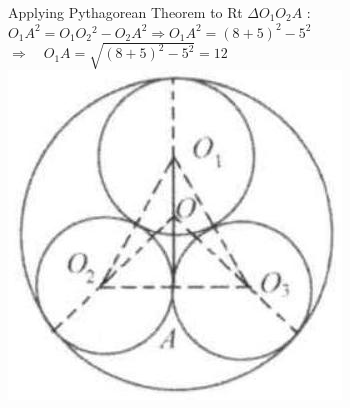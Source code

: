 \documentclass[10pt]{article}
\begin{document}
Applying Pythagorean Theorem to Rt \(\Delta O_{1} O_{2} A\) :\\
\(O_{1} A^{2}=O_{1} O_{2}{ }^{2}-O_{2} A^{2} \Rightarrow O_{1} A^{2}=(8+5)^{2}-5^{2}\)\\
\(\Rightarrow \quad O_{1} A=\sqrt{(8+5)^{2}-5^{2}}=12\)\\
\includegraphics[max width=\textwidth, center]{2025_04_17_97bc1f7e44d93c271a88g-180(1)}
\end{document}
